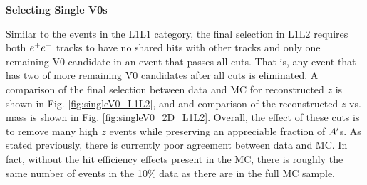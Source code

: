 \clearpage

\textbf{Selecting Single V0s}


Similar to the events in the L1L1 category, the final selection in L1L2 requires both $e^{+}e^{-}$ tracks to have no shared hits with other tracks and only one remaining V0 candidate in an event that passes all cuts. That is, any event that has two of more remaining V0 candidates after all cuts is eliminated. A comparison of the final selection between data and MC for reconstructed $z$ is shown in Fig. \ref{fig:singleV0_L1L2}, and and comparison of the reconstructed $z$ vs. mass is shown in Fig. \ref{fig:singleV0_2D_L1L2}. Overall, the effect of these cuts is to remove many high $z$ events while preserving an appreciable fraction of $A^\prime$s. As stated previously, there is currently poor agreement between data and MC. In fact, without the hit efficiency effects present in the MC, there is roughly the same number of events in the 10\% data as there are in the full MC sample.




